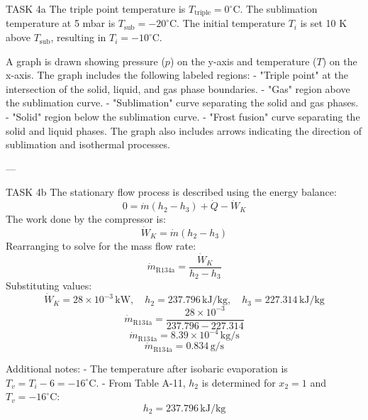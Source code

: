 TASK 4a  
The triple point temperature is \( T_{\text{triple}} = 0^\circ\text{C} \).  
The sublimation temperature at 5 mbar is \( T_{\text{sub}} = -20^\circ\text{C} \).  
The initial temperature \( T_i \) is set 10 K above \( T_{\text{sub}} \), resulting in \( T_i = -10^\circ\text{C} \).  

A graph is drawn showing pressure (\( p \)) on the y-axis and temperature (\( T \)) on the x-axis. The graph includes the following labeled regions:  
- "Triple point" at the intersection of the solid, liquid, and gas phase boundaries.  
- "Gas" region above the sublimation curve.  
- "Sublimation" curve separating the solid and gas phases.  
- "Solid" region below the sublimation curve.  
- "Frost fusion" curve separating the solid and liquid phases.  
The graph also includes arrows indicating the direction of sublimation and isothermal processes.

---

TASK 4b  
The stationary flow process is described using the energy balance:  
\[
0 = \dot{m} (h_2 - h_3) + \dot{Q} - \dot{W}_K
\]  
The work done by the compressor is:  
\[
\dot{W}_K = \dot{m} (h_2 - h_3)
\]  
Rearranging to solve for the mass flow rate:  
\[
\dot{m}_{\text{R134a}} = \frac{\dot{W}_K}{h_2 - h_3}
\]  
Substituting values:  
\[
\dot{W}_K = 28 \times 10^{-3} \, \text{kW}, \quad h_2 = 237.796 \, \text{kJ/kg}, \quad h_3 = 227.314 \, \text{kJ/kg}
\]  
\[
\dot{m}_{\text{R134a}} = \frac{28 \times 10^{-3}}{237.796 - 227.314}
\]  
\[
\dot{m}_{\text{R134a}} = 8.39 \times 10^{-4} \, \text{kg/s}
\]  
\[
\dot{m}_{\text{R134a}} = 0.834 \, \text{g/s}
\]  

Additional notes:  
- The temperature after isobaric evaporation is \( T_v = T_i - 6 = -16^\circ\text{C} \).  
- From Table A-11, \( h_2 \) is determined for \( x_2 = 1 \) and \( T_v = -16^\circ\text{C} \):  
\[
h_2 = 237.796 \, \text{kJ/kg}
\]
